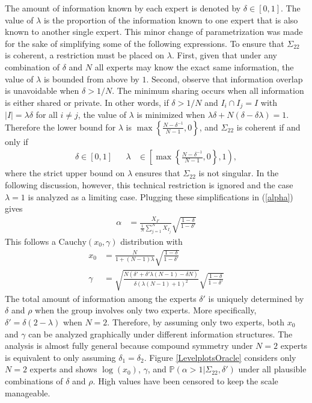 \documentclass[11pt]{article}
\renewcommand{\P}{\mathbb{P}}
\theoremstyle{definition}
\theoremstyle{definition}
\def\P{{\mathbb P}}
\begin{document}
The amount of information known by each expert is denoted 
by $\delta \in [0,1]$.  The value of $\lambda$ is the proportion 
of the information known to one expert that is also known to
another single expert.  This minor change of parametrization 
was made for the sake of simplifying some of the following expressions. 
To ensure that $\Sigma_{22}$ is coherent, a restriction must 
be placed on $\lambda$. 
First, given that under any combination of $\delta$ and $N$ all experts 
may know the exact same information, the value of $\lambda$ is 
bounded from above by $1$. Second, observe that information overlap 
is unavoidable when $\delta > 1/N$.  The minimum sharing occurs when 
all information is either shared or private.  In other words, 
if $\delta > 1/N$ and $I_{i} \cap I_j = I$ with $|I| =  \lambda \delta$ 
for all $i \neq j$, the value of $\lambda$ is minimized when 
$\lambda\delta + N(\delta - \delta\lambda) = 1$.  Therefore the 
lower bound for $\lambda$ is $\max \left\{ \frac{N-\delta^{-1}}{N-1}, 
0\right\}$, and $\Sigma_{22}$ is coherent if and only if
\begin{align}
\delta \in [0,1] &&  \lambda &\in \left[  
   \max \left\{ \frac{N-\delta^{-1}}{N-1}, 0\right\}, 1 \right), 
   \label{rhoDomain}
\end{align}
where the strict upper bound on $\lambda$ ensures that
$\Sigma_{22}$ is not singular.  In the following discussion, 
however, this technical restriction is ignored and the case 
$\lambda = 1$ is analyzed as a limiting case.
Plugging these simplifications in (\ref{alpha}) gives 
\begin{align*}
\alpha &= \frac{X_{I'}}{\frac{1}{N}\sum_{j=1}^N X_{I_j}} 
  \sqrt{\frac{1-\delta}{1-\delta'}} 
\end{align*}
This follows a $\text{Cauchy}(x_0, \gamma)$ distribution with
\begin{align*}
x_0 &= \frac{N}{1+(N-1)\lambda}  \sqrt{\frac{1-\delta}{1-\delta'}}\\[2ex]
  \gamma &=  \sqrt{\frac{N(\delta' + \delta' \lambda (N-1) - \delta N)}
  {\delta (\lambda (N-1) + 1)^2}}\sqrt{\frac{1-\delta}{1-\delta'}}
\end{align*}
The total amount of information among the experts $\delta'$ is uniquely determined by $\delta$ and $\rho$ when the group involves only two experts. More specifically, $\delta' = \delta(2 - \lambda)$ when $N=2$. Therefore, by assuming only two experts, both $x_0$ and $\gamma$ can be analyzed graphically under different information structures. The analysis is almost fully general because compound symmetry under $N = 2$ experts is equivalent to only assuming $\delta_1 = \delta_2$. Figure \ref{LevelplotsOracle} considers only $N=2$ experts and shows $\log(x_0)$, $\gamma$, and $\P(\alpha > 1 | \Sigma_{22}, \delta')$ under all plausible combinations of $\delta$ and $\rho$. High values have been censored to keep the scale manageable. 
\end{document}
